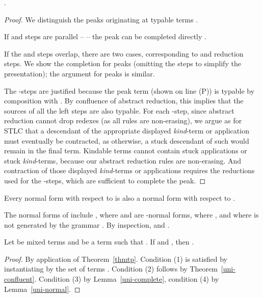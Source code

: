 \documentclass{LMCS}
\begin{document}
\begin{lem}
\label{uni-complete}
  . 
\end{lem}


\begin{proof}
We distinguish the peaks originating at typable terms . 

If  and  steps are parallel --   -- the peak can be completed
directly .

If the  and  steps overlap, there are two cases,
corresponding to  and
 reduction steps. We show the completion
for  peaks (omitting the 
steps to simplify the presentation); the argument for
 peaks is similar.



\noindent The -steps are justified because the peak term
(shown on line (P)) is typable by composition with .  By confluence of
abstract reduction, this implies that the sources of all the left
steps are also typable.  For each -step, since abstract
reduction cannot drop redexes (as all rules are non-erasing), we argue
as for STLC that a descendant of the appropriate displayed
\textit{kind}-term or application must eventually be contracted, as
otherwise, a stuck descendant of such would remain in the final term.
Kindable terms cannot contain stuck applications or stuck
\textit{kind}-terms, because our abstract reduction rules are
non-erasing.  And contraction of those displayed \textit{kind}-terms
or applications requires the reductions used for the -steps,
which are sufficient to complete the peak.
\end{proof}


\begin{lem}
  \label{uni-normal}
  Every normal form with respect to  is also a normal form with respect to .
\end{lem}

The normal forms of  include ,  where 
and  are -normal forms,  where , and
 where  is not generated by the grammar . By inspection,  and .

\begin{thm}
\label{thm:presuni}
Let  be mixed terms and  be a term such that . 
If  and , then .


\begin{proof}
  By application of Theorem~\ref{thmtp}. Condition (1) is satisfied by
  instantiating  by the set  of terms . Condition (2) follows by
  Theorem~\ref{uni-confluent}. Condition (3) by
  Lemma~\ref{uni-complete}, condition (4) by Lemma~\ref{uni-normal}.
\end{proof}
\end{thm}
\end{document}
